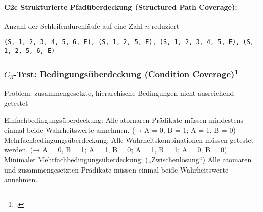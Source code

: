 \documentclass{lehramt-informatik-haupt}
\begin{document}
%

\paragraph{C2c Strukturierte Pfadüberdeckung (Structured Path Coverage):}

\noindent
Anzahl der Schleifendurchläufe auf eine
Zahl $n$ reduziert


\texttt{(S, 1, 2, 3, 4, 5, 6, E), (S, 1, 2, 5, E),
(S, 1, 2, 3, 4, 5, E), (S, 1, 2, 5, 6, E)}

%

\subsubsection{$C_3$-Test: Bedingungsüberdeckung (Condition Coverage)\footcite[Seite 40]{sosy:fs:5}}

Problem: zusammengesetzte, hierarchische Bedingungen nicht ausreichend
getestet

Einfachbedingungsüberdeckung:
Alle atomaren Prädikate müssen mindestens einmal beide Wahrheitswerte
annehmen.
(→ A = 0, B = 1; A = 1, B = 0)
Mehrfachbedingungsüberdeckung:
Alle Wahrheitskombinationen müssen getestet werden.
(→ A = 0, B = 1; A = 1, B = 0; A = 1, B = 1; A = 0, B = 0)
Minimaler Mehrfachbedingungsüberdeckung: („Zwischenlösung“)
Alle atomaren und zusammengesetzten Prädikate müssen einmal beide
Wahrheitswerte annehmen.
\end{document}
